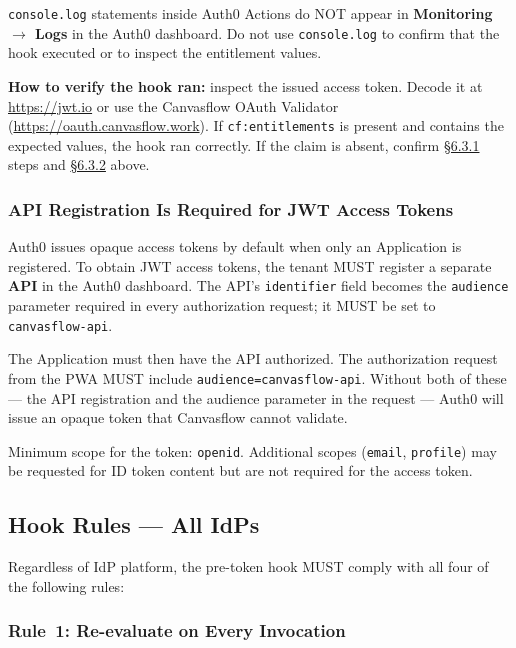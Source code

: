 \texttt{console.log} statements inside Auth0 Actions do NOT appear in
\textbf{Monitoring $\to$ Logs} in the Auth0 dashboard. Do not use \texttt{console.log}
to confirm that the hook executed or to inspect the entitlement values.

\textbf{How to verify the hook ran:} inspect the issued access token. Decode it at
\url{https://jwt.io} or use the Canvasflow OAuth Validator
(\url{https://oauth.canvasflow.work}). If \texttt{cf:entitlements} is present and
contains the expected values, the hook ran correctly. If the claim is absent, confirm
\hyperref[sec:non-namespace-custom-claim]{\S6.3.1} steps and 
\hyperref[sec:action-deployment]{\S6.3.2} above.


\subsubsection{API Registration Is Required for JWT Access Tokens}\label{sec:api-registration-required}

Auth0 issues opaque access tokens by default when only an Application is registered. To
obtain JWT access tokens, the tenant MUST register a separate \textbf{API} in the Auth0
dashboard. The API's \texttt{identifier} field becomes the \texttt{audience} parameter
required in every authorization request; it MUST be set to \texttt{canvasflow-api}.

The Application must then have the API authorized. The authorization request from the
PWA MUST include \texttt{audience=canvasflow-api}. Without both of these --- the API
registration and the audience parameter in the request --- Auth0 will issue an opaque
token that Canvasflow cannot validate.

Minimum scope for the token: \texttt{openid}. Additional scopes (\texttt{email},
\texttt{profile}) may be requested for ID token content but are not required for the
access token.

\pagebreak

\subsection{Hook Rules --- All IdPs}\label{sec:hook-rules}

Regardless of IdP platform, the pre-token hook MUST comply with all four of the
following rules:

\subsubsection{Rule~1: Re-evaluate on Every Invocation}

